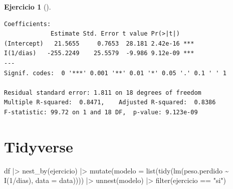 \documentclass[
  a4paper,
]{scrreport}
\newenvironment{Shaded}{\begin{snugshade}}{\end{snugshade}}
\newcommand{\AttributeTok}[1]{\textcolor[rgb]{0.40,0.45,0.13}{#1}}
\newcommand{\DecValTok}[1]{\textcolor[rgb]{0.68,0.00,0.00}{#1}}
\newcommand{\FunctionTok}[1]{\textcolor[rgb]{0.28,0.35,0.67}{#1}}
\newcommand{\NormalTok}[1]{\textcolor[rgb]{0.00,0.23,0.31}{#1}}
\newcommand{\SpecialCharTok}[1]{\textcolor[rgb]{0.37,0.37,0.37}{#1}}
\newcommand{\StringTok}[1]{\textcolor[rgb]{0.13,0.47,0.30}{#1}}
\theoremstyle{definition}
\newtheorem{exercise}{Ejercicio}[chapter]
\theoremstyle{remark}
\begin{document}
\begin{exercise}[]
\begin{enumerate}
\begin{tcolorbox}
\begin{verbatim}
Coefficients:
             Estimate Std. Error t value Pr(>|t|)    
(Intercept)   21.5655     0.7653  28.181 2.42e-16 ***
I(1/dias)   -255.2249    25.5579  -9.986 9.12e-09 ***
---
Signif. codes:  0 '***' 0.001 '**' 0.01 '*' 0.05 '.' 0.1 ' ' 1

Residual standard error: 1.811 on 18 degrees of freedom
Multiple R-squared:  0.8471,    Adjusted R-squared:  0.8386 
F-statistic: 99.72 on 1 and 18 DF,  p-value: 9.123e-09
\end{verbatim}

  \section{Tidyverse}

\begin{Shaded}
\begin{Highlighting}[]
\NormalTok{df }\SpecialCharTok{|\textgreater{}}
    \FunctionTok{nest\_by}\NormalTok{(ejercicio) }\SpecialCharTok{|\textgreater{}} 
    \FunctionTok{mutate}\NormalTok{(}\AttributeTok{modelo =} \FunctionTok{list}\NormalTok{(}\FunctionTok{tidy}\NormalTok{(}\FunctionTok{lm}\NormalTok{(peso.perdido }\SpecialCharTok{\textasciitilde{}} \FunctionTok{I}\NormalTok{(}\DecValTok{1}\SpecialCharTok{/}\NormalTok{dias), }\AttributeTok{data =}\NormalTok{ data)))) }\SpecialCharTok{|\textgreater{}} 
    \FunctionTok{unnest}\NormalTok{(modelo) }\SpecialCharTok{|\textgreater{}}
    \FunctionTok{filter}\NormalTok{(ejercicio }\SpecialCharTok{==} \StringTok{"si"}\NormalTok{)}
\end{Highlighting}
\end{Shaded}


\end{tcolorbox}
\end{enumerate}
\end{exercise}
\end{document}

